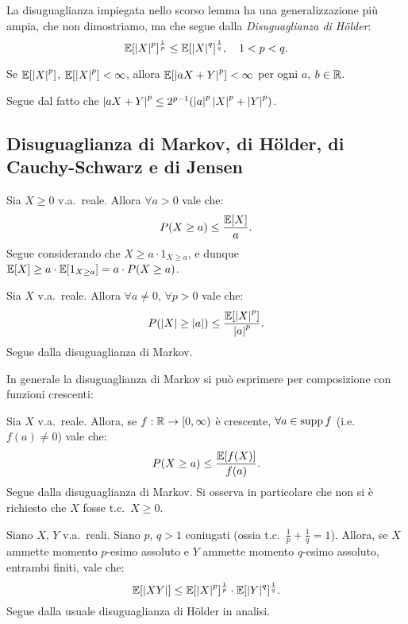 \begin{multicols*}{2}
\begin{remark}
    La disuguaglianza impiegata nello scorso lemma ha una generalizzazione
    più ampia, che non dimostriamo, ma che segue dalla \textit{Disuguaglianza di Hölder}:
    \[
        \mathbb{E}[\left\lvert X \right\rvert^p]^{\frac{1}{p}} \leq \mathbb{E}[\left\lvert X \right\rvert^q]^{\frac{1}{q}}, \quad 1 < p < q.
    \]
\end{remark}

\begin{lemma}
    Se $\mathbb{E}[\left\lvert X \right\rvert^p]$, $\mathbb{E}[\left\lvert X \right\rvert^p] < \infty$, allora
    $\mathbb{E}[\left\lvert aX+Y \right\rvert^p] < \infty$ per ogni $a$, $b \in \mathbb{R}$. \smallskip

    Segue dal fatto che $\left\lvert aX+Y \right\rvert^p \leq 2^{p-1} (\left\lvert a \right\rvert^p \left\lvert X \right\rvert^p + \left\lvert Y \right\rvert^p)$.
\end{lemma}

\subsection{Disuguaglianza di Markov, di Hölder, di Cauchy-Schwarz e di Jensen}

\begin{proposition}
    Sia $X \geq 0$ v.a.~reale. Allora $\forall a > 0$ vale che:
    \[
        P(X \geq a) \leq \frac{\mathbb{E}[X]}{a}.
    \]
    Segue considerando che $X \geq a \cdot 1_{X \geq a}$,
    e dunque $\mathbb{E}[X] \geq a \cdot \mathbb{E}[1_{X \geq a}] = a \cdot P(X \geq a)$.
\end{proposition}

\begin{corollary}
    Sia $X$ v.a.~reale. Allora $\forall a \neq 0$, $\forall p > 0$ vale che:
    \[
        P(\left\lvert X \right\rvert \geq \left\lvert a \right\rvert) \leq \frac{\mathbb{E}[\left\lvert X \right\rvert^p]}{\left\lvert a \right\rvert^p}.
    \]
    Segue dalla disuguaglianza di Markov.
\end{corollary}

In generale la disuguaglianza di Markov si può esprimere per composizione
con funzioni crescenti:

\begin{corollary}
    Sia $X$ v.a.~reale. Allora, se $f : \mathbb{R} \to [0, \infty)$ è crescente, $\forall a \in \operatorname{supp} f$ (i.e.~$f(a) \neq 0$) vale che:
    \[
        P(X \geq a) \leq \frac{\mathbb{E}[f(X)]}{f(a)}.
    \]
    Segue dalla disuguaglianza di Markov. Si osserva in particolare che non si è richiesto
    che $X$ fosse t.c.~$X \geq 0$.
\end{corollary}

\begin{proposition}
    Siano $X$, $Y$ v.a.~reali. Siano $p$, $q > 1$ coniugati (ossia t.c.~$\frac{1}{p} + \frac{1}{q} = 1$). Allora, se $X$ ammette momento $p$-esimo assoluto e $Y$ ammette momento
    $q$-esimo assoluto, entrambi finiti, vale che:
    \[
        \mathbb{E}[\left\lvert XY \right\rvert] \leq \mathbb{E}[\left\lvert X \right\rvert^p]^{\frac{1}{p}} \cdot \mathbb{E}[\left\lvert Y \right\rvert^q]^{\frac{1}{q}}.
    \]
    Segue dalla usuale disuguaglianza di Hölder in analisi.
\end{proposition}


\end{multicols*}
